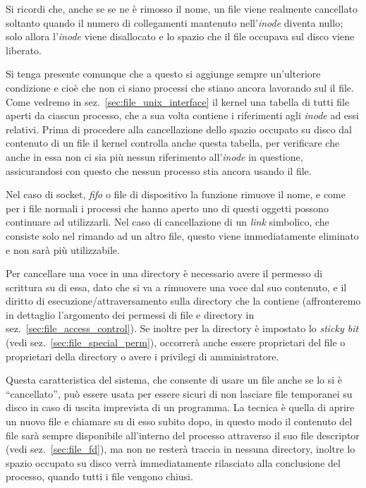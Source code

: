 Si ricordi che, anche se se ne è rimosso il nome, un file viene realmente
cancellato soltanto quando il numero di collegamenti mantenuto
nell'\textit{inode} diventa nullo; solo allora l'\textit{inode} viene
disallocato e lo spazio che il file occupava sul disco viene liberato.

Si tenga presente comunque che a questo si aggiunge sempre un'ulteriore
condizione e cioè che non ci siano processi che stiano ancora lavorando sul il
file. Come vedremo in sez.~\ref{sec:file_unix_interface} il kernel una tabella
di tutti file aperti da ciascun processo, che a sua volta contiene i
riferimenti agli \textit{inode} ad essi relativi. Prima di procedere alla
cancellazione dello spazio occupato su disco dal contenuto di un file il
kernel controlla anche questa tabella, per verificare che anche in essa non ci
sia più nessun riferimento all'\textit{inode} in questione, assicurandosi con
questo che nessun processo stia ancora usando il file.

Nel caso di socket, \textit{fifo} o file di dispositivo la funzione rimuove il
nome, e come per i file normali i processi che hanno aperto uno di questi
oggetti possono continuare ad utilizzarli.  Nel caso di cancellazione di un
\textit{link} simbolico, che consiste solo nel rimando ad un altro file,
questo viene immediatamente eliminato e non sarà più utilizzabile. 

Per cancellare una voce in una directory è necessario avere il permesso di
scrittura su di essa, dato che si va a rimuovere una voce dal suo contenuto, e
il diritto di esecuzione/attraversamento sulla directory che la contiene
(affronteremo in dettaglio l'argomento dei permessi di file e directory in
sez.~\ref{sec:file_access_control}). Se inoltre per la directory è impostato
lo \textit{sticky bit} (vedi sez.~\ref{sec:file_special_perm}), occorrerà
anche essere proprietari del file o proprietari della directory o avere i
privilegi di amministratore.

Questa caratteristica del sistema, che consente di usare un file anche se lo
si è ``cancellato'', può essere usata per essere sicuri di non lasciare file
temporanei su disco in caso di uscita imprevista di un programma. La tecnica è
quella di aprire un nuovo file e chiamare  su di esso subito
dopo, in questo modo il contenuto del file sarà sempre disponibile all'interno
del processo attraverso il suo file descriptor (vedi sez.~\ref{sec:file_fd}),
ma non ne resterà traccia in nessuna directory, inoltre lo spazio occupato su
disco verrà immediatamente rilasciato alla conclusione del processo, quando
tutti i file vengono chiusi.

